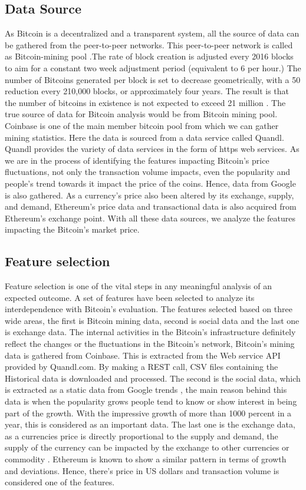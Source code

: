 \documentclass[sigconf]{acmart}
\begin{document}
 
 \subsection{Data Source}
 As Bitcoin is a decentralized and a transparent system, all the source of data can be gathered from the peer-to-peer networks. This peer-to-peer network is called as Bitcoin-mining pool \cite{1:online}.The rate of block creation is adjusted every 2016 blocks to aim for a constant two week adjustment period (equivalent to 6 per hour.) The number of Bitcoins generated per block is set to decrease geometrically, with a 50 reduction every 210,000 blocks, or approximately four years. The result is that the number of bitcoins in existence is not expected to exceed 21 million \cite{2:online}.
The true source of data for Bitcoin analysis would be from Bitcoin mining pool. Coinbase is one of the main member bitcoin pool from which we can gather mining statistics. Here the data is sourced from a data service called Quandl. Quandl provides the variety of data services in the form of https web services. As we are in the process of identifying the features impacting Bitcoin's price fluctuations, not only the transaction volume impacts, even the popularity and people's trend towards it impact the price of the coins. Hence, data from Google is also gathered. As a currency's price also been altered by its exchange, supply, and demand, Ethereum's price data and transactional data is also acquired from Ethereum's exchange point.
With all these data sources, we analyze the features impacting the Bitcoin's market price. 
 
 
 \subsection{Feature selection}
 Feature selection is one of the vital steps in any meaningful analysis of an expected outcome. A set of features have been selected to analyze its interdependence with Bitcoin's evaluation. The features selected based on three wide areas, the first is Bitcoin mining data, second is social data and the last one is exchange data.
 The internal activities in the Bitcoin's infrastructure definitely reflect the changes or the fluctuations in the Bitcoin's network, Bitcoin's mining data is gathered from Coinbase. This is extracted from the Web service API provided by Quandl.com\cite{3:online}. By making a REST call, CSV files containing the Historical data is downloaded and processed.
 The second is the social data, which is extracted as a static data from Google trends \cite{google:online}, the main reason behind this data is when the popularity grows people tend to know or show interest in being part of the growth. With the impressive growth of more than 1000 percent in a year, this is considered as an important data.
 The last one is the exchange data, as a currencies price is directly proportional to the supply and demand, the supply of the currency can be impacted by the exchange to other currencies or commodity \cite{4:online}. Ethereum is known to show a similar pattern in terms of growth and deviations\cite{Ethereum:online}. Hence, there's price in US dollars and transaction volume is considered one of the features.
\end{document}
